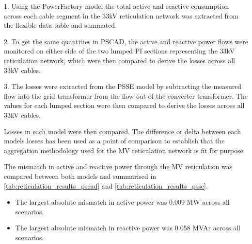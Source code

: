 \documentclass{../grid-link-report}
\begin{document}
	1. Using the PowerFactory model the total active and reactive consumption across each cable segment in the 33kV reticulation network was extracted from the flexible data table and summated.
	
	2. To get the same quantities in PSCAD, the active and reactive power flows were monitored on either side of the two lumped PI sections representing the 33kV reticulation network, which were then compared to derive the losses across all 33kV cables.
	
	3. The losses were extracted from the PSSE model by subtracting the measured flow into the grid transformer from the flow out of the converter transformer. The values for each lumped section were then compared to derive the losses across all 33kV cables.
	
	Losses in each model were then compared. The difference or delta between each models losses has been used as a point of comparison to establish that the aggregation methodology used for the MV reticulation network is fit for purpose.
	
	The mismatch in active and reactive power through the \ac{MV} reticulation was compared between both models and summarised in \ref{tab:reticulation_results_pscad} and \ref{tab:reticulation_results_psse}. 
	
	\begin{itemize}
		\item The largest absolute mismatch in active power was 0.009 MW across all scenarios.
		\item The largest absolute mismatch in reactive power was 0.058 MVAr across all scenarios.
	\end{itemize} 
	
\end{document}
